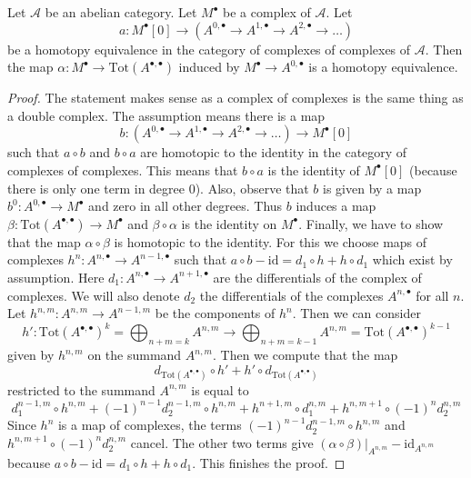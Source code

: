 \begin{lemma}
\label{lemma-homotopy-complex-complexes}
Let $\mathcal{A}$ be an abelian category.
Let $M^\bullet$ be a complex of $\mathcal{A}$. Let
$$
a :
M^\bullet[0]
\longrightarrow
\left(A^{0, \bullet} \to A^{1, \bullet} \to A^{2, \bullet} \to \ldots \right)
$$
be a homotopy equivalence in the category of complexes of complexes
of $\mathcal{A}$. Then the map
$\alpha : M^\bullet \to \text{Tot}(A^{\bullet, \bullet})$
induced by $M^\bullet \to A^{0, \bullet}$ is a homotopy equivalence.
\end{lemma}

\begin{proof}
The statement makes sense as a complex of complexes is the same thing
as a double complex. The assumption means there is a map
$$
b :
\left(A^{0, \bullet} \to A^{1, \bullet} \to A^{2, \bullet} \to \ldots \right)
\longrightarrow
M^\bullet[0]
$$
such that $a \circ b$ and $b \circ a$ are homotopic to the identity
in the category of complexes of complexes. This means that $b \circ a$
is the identity of $M^\bullet[0]$ (because there is only one term in
degree $0$). Also, observe that $b$ is given by a map
$b^0 : A^{0, \bullet} \to M^\bullet$ and zero in all other degrees.
Thus $b$ induces a map
$\beta : \text{Tot}(A^{\bullet, \bullet}) \to M^\bullet$
and $\beta \circ \alpha$ is the identity on $M^\bullet$.
Finally, we have to show that the map
$\alpha \circ \beta$ is homotopic to the identity.
For this we choose maps of complexes
$h^n : A^{n, \bullet} \to A^{n - 1, \bullet}$
such that $a \circ b - \text{id} = d_1 \circ h + h \circ d_1$
which exist by assumption. Here $d_1 : A^{n, \bullet} \to A^{n + 1, \bullet}$
are the differentials of the complex of complexes. We will also
denote $d_2$ the differentials of the complexes $A^{n, \bullet}$
for all $n$. Let $h^{n, m} : A^{n, m} \to A^{n - 1, m}$ be the components of
$h^n$. Then we can consider
$$
h' : \text{Tot}(A^{\bullet, \bullet})^k =
\bigoplus\nolimits_{n + m = k} A^{n, m}
\to
\bigoplus\nolimits_{n + m = k - 1} A^{n, m} =
\text{Tot}(A^{\bullet, \bullet})^{k - 1}
$$
given by $h^{n, m}$ on the summand $A^{n, m}$. Then we compute
that the map
$$
d_{\text{Tot}(A^{\bullet, \bullet})} \circ h' +
h' \circ d_{\text{Tot}(A^{\bullet, \bullet})}
$$
restricted to the summand $A^{n, m}$ is equal to
$$
d_1^{n - 1, m} \circ h^{n, m} +
(-1)^{n - 1} d_2^{n - 1, m} \circ h^{n, m} +
h^{n + 1, m} \circ d_1^{n, m} + h^{n, m + 1} \circ (-1)^nd_2^{n, m}
$$
Since $h^n$ is a map of complexes, the terms
$(-1)^{n - 1} d_2^{n - 1, m} \circ h^{n, m}$ and
$h^{n, m + 1} \circ (-1)^nd_2^{n, m}$ cancel.
The other two terms give
$(\alpha \circ \beta)|_{A^{n, m}} - \text{id}_{A^{n, m}}$
because $a \circ b - \text{id} = d_1 \circ h + h \circ d_1$.
This finishes the proof.
\end{proof}








